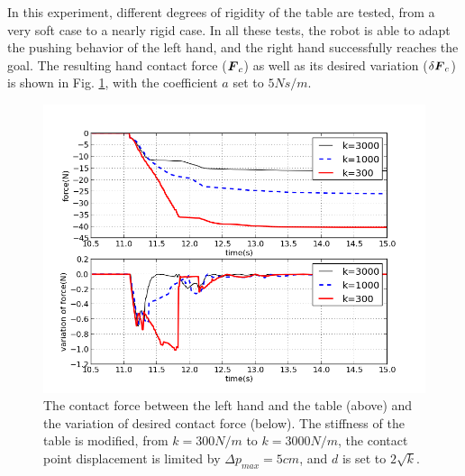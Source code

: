 \documentclass[letterpaper, 10 pt, conference]{ieeeconf}  %
\newcommand{\vect}[1]{\mbox{\boldmath${#1}$}}%
\begin{document}
In this experiment, different degrees of rigidity of the table are tested, from a very soft case to a nearly rigid case. In all these tests, the robot is able to adapt the pushing behavior of the left hand, and the right hand successfully reaches the goal.
The resulting hand contact force ($\vect{F}_c$) as well as its desired variation ($\delta\vect{F}_c$) is shown in Fig. \ref{reaching_force}, with the coefficient $a$ set to $5 Ns/m$.
\begin{figure}[!t]
\centering
\includegraphics[width=\linewidth]{../figure/force_k300-3000_d5.png}
\caption{The contact force between the left hand and the table (above) and the variation of desired contact force (below). The stiffness of the table is modified, from $k=300 N/m$ to $k=3000 N/m$, the contact point displacement is limited by $\Delta p_{max} = 5 cm$, and $d$ is set to $2\sqrt{k}$.}
\label{reaching_force}
\end{figure}
\end{document}
